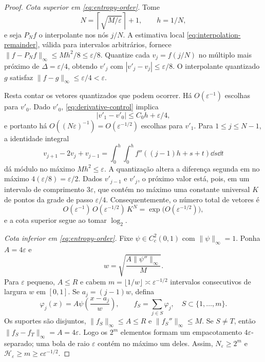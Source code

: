 \begin{proof}
\emph{Cota superior em \eqref{eq:entropy-order}.} Tome
\[
 N=\left\lceil\sqrt{M/\varepsilon}\right\rceil+1,\qquad h=1/N,
\]
e seja $P_Nf$ o interpolante nos nós $j/N$. A estimativa local \eqref{eq:interpolation-remainder}, válida para intervalos arbitrários, fornece $\|f-P_Nf\|_\infty\le Mh^2/8\le\varepsilon/8$. Quantize cada $v_j=f(j/N)$ no múltiplo mais próximo de $\Delta=\varepsilon/4$, obtendo $v'_j$ com $|v'_j-v_j|\le\varepsilon/8$. O interpolante quantizado $g$ satisfaz $\|f-g\|_\infty\le\varepsilon/4<\varepsilon$.

Resta contar os vetores quantizados que podem ocorrer. Há $O(\varepsilon^{-1})$ escolhas para $v'_0$. Dado $v'_0$, \eqref{eq:derivative-control} implica
\[
 |v'_1-v'_0|\le C_0h+\varepsilon/4,
\]
e portanto há $O((N\varepsilon)^{-1})=O(\varepsilon^{-1/2})$ escolhas para $v'_1$. Para $1\le j\le N-1$, a identidade integral
\[
 v_{j+1}-2v_j+v_{j-1}
 =\int_0^h\int_0^h
 f''((j-1)h+s+t)\dd s\dd t
\]
dá módulo no máximo $Mh^2\le\varepsilon$. A quantização altera a diferença segunda em no máximo $4(\varepsilon/8)=\varepsilon/2$. Dados $v'_{j-1}$ e $v'_j$, o próximo valor está, pois, em um intervalo de comprimento $3\varepsilon$, que contém no máximo uma constante universal $K$ de pontos da grade de passo $\varepsilon/4$. Consequentemente, o número total de vetores é
\[
 O(\varepsilon^{-1})\,O(\varepsilon^{-1/2})\,K^N
 =\exp\bigl(O(\varepsilon^{-1/2})\bigr),
\]
e a cota superior segue ao tomar $\log_2$.

\emph{Cota inferior em \eqref{eq:entropy-order}.} Fixe $\psi\in C_c^2(0,1)$ com $\|\psi\|_\infty=1$. Ponha $A=4\varepsilon$ e
\[
 w=\sqrt{\frac{A\|\psi''\|_\infty}{M}}.
\]
Para $\varepsilon$ pequeno, $A\le R$ e cabem $m=\lfloor1/w\rfloor\asymp\varepsilon^{-1/2}$ intervalos consecutivos de largura $w$ em $[0,1]$. Se $a_j=(j-1)w$, defina
\[
 \varphi_j(x)=A\psi\!\left(\frac{x-a_j}{w}\right),\qquad
 f_S=\sum_{j\in S}\varphi_j,\quad S\subset\{1,\ldots,m\}.
\]
Os suportes são disjuntos, $\|f_S\|_\infty\le A\le R$ e $\|f_S''\|_\infty\le M$. Se $S\neq T$, então $\|f_S-f_T\|_\infty=A=4\varepsilon$. Logo os $2^m$ elementos formam um empacotamento $4\varepsilon$-separado; uma bola de raio $\varepsilon$ contém no máximo um deles. Assim, $N_\varepsilon\ge2^m$ e $\mathcal{H}_\varepsilon\ge m\ge c\varepsilon^{-1/2}$.


\end{proof}
